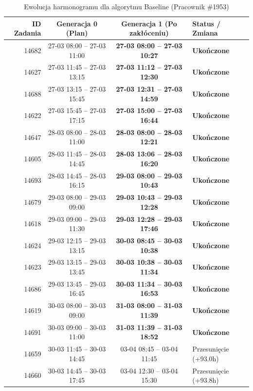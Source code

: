 \begin{table}[htbp]
\centering\small
\caption{Ewolucja harmonogramu dla algorytmu Baseline (Pracownik \#1953)}
\label{tab:case_study_baseline_u1953}
\begin{tabular}{|r|c|c|l|}
\hline
\textbf{ID Zadania} & \textbf{Generacja 0 (Plan)} & \textbf{Generacja 1 (Po zakłóceniu)} & \textbf{Status / Zmiana} \\ \hline
14682 & 27-03 08:00 -- 27-03 11:00 & \textbf{27-03 08:00 -- 27-03 10:27} & \textbf{Ukończone} \\ 
14627 & 27-03 11:45 -- 27-03 13:15 & \textbf{27-03 11:12 -- 27-03 12:30} & \textbf{Ukończone} \\ 
14688 & 27-03 13:15 -- 27-03 15:45 & \textbf{27-03 12:31 -- 27-03 14:59} & \textbf{Ukończone} \\ 
14622 & 27-03 15:45 -- 27-03 17:15 & \textbf{27-03 15:00 -- 27-03 16:44} & \textbf{Ukończone} \\ 
14647 & 28-03 08:00 -- 28-03 11:00 & \textbf{28-03 08:00 -- 28-03 12:21} & \textbf{Ukończone} \\ 
14605 & 28-03 11:45 -- 28-03 14:45 & \textbf{28-03 13:06 -- 28-03 16:20} & \textbf{Ukończone} \\ 
14693 & 28-03 14:45 -- 28-03 16:15 & \textbf{29-03 08:00 -- 29-03 10:43} & \textbf{Ukończone} \\ 
14679 & 29-03 08:00 -- 29-03 09:00 & \textbf{29-03 10:43 -- 29-03 12:28} & \textbf{Ukończone} \\ 
14618 & 29-03 09:00 -- 29-03 11:30 & \textbf{29-03 12:28 -- 29-03 17:46} & \textbf{Ukończone} \\ 
14624 & 29-03 12:15 -- 29-03 13:15 & \textbf{30-03 08:45 -- 30-03 10:38} & \textbf{Ukończone} \\ 
14623 & 29-03 13:15 -- 29-03 13:45 & \textbf{30-03 10:38 -- 30-03 11:34} & \textbf{Ukończone} \\ 
14686 & 29-03 13:45 -- 29-03 16:45 & \textbf{30-03 11:34 -- 30-03 16:53} & \textbf{Ukończone} \\ 
14619 & 30-03 08:00 -- 30-03 09:00 & \textbf{31-03 08:00 -- 31-03 11:39} & \textbf{Ukończone} \\ 
14691 & 30-03 09:00 -- 30-03 11:00 & \textbf{31-03 11:39 -- 31-03 18:52} & \textbf{Ukończone} \\ 
14659 & 30-03 11:45 -- 30-03 14:45 & 03-04 08:45 -- 03-04 11:45 & Przesunięcie (+93.0h) \\ 
14660 & 30-03 14:45 -- 30-03 17:45 & 03-04 12:30 -- 03-04 15:30 & Przesunięcie (+93.8h) \\ 

\end{tabular}
\end{table}
